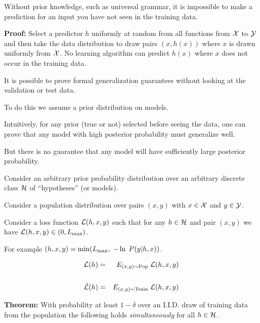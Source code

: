 {{Without prior knowledge, such as universal grammar, it is impossible to make a prediction for an input you have not seen in the training data.


\vfill
{\bf Proof:} Select a predictor $h$ uniformly at random from all functions from ${\cal X}$ to ${\cal Y}$ and then take the data distribution to draw pairs $(x, h(x))$
where $x$ is drawn uniformly from ${\cal X}$.  No learning algorithm can predict $h(x)$ where $x$ does not occur in the training data.

}


It is possible to prove formal generalization guarantees without looking at the validation or test data.

\vfill
To do this we assume a prior distribution on models.

\vfill
Intuitively, for any prior (true or not) selected before seeing the data, one can prove that
any model with high posterior probability must generalize well.

\vfill
But there is no guarantee that any model will have sufficiently large posterior probability.



Consider an arbitrary prior probability distribution over an arbitrary discrete class ${\cal H}$ of ``hypotheses'' (or models).

\vfill
Consider a population distribution over pairs $(x,y)$ with $x \in {\cal X}$ and $y \in {\cal Y}$.

\vfill
Consider a loss function ${\cal L}(h,x,y)$ such that for any $h \in {\cal H}$ and pair $(x,y)$ we have
${\cal L}(h,x,y) \in (0,L_\mathrm{max})$.

\vfill
For example ${\cal }(h,x,y) = \min(L_\mathrm{max},\; - \ln\; P(y|h,x))$.

\begin{eqnarray*}
{\cal L}(h)  & = &  E_{(x,y)\sim \mathrm{Pop}}\;{\cal L}(h,x,y) \\
\\
\hat{{\cal L}}(h) & = & E_{(x,y)\sim \mathrm{Train}}\;{\cal L}(h,x,y)
\end{eqnarray*}

\vfill
    {\bf Theorem:} With probability
    at least $1-\delta$ over an I.I.D. draw of training data from the population the following holds {\em simultaneously} for all $h \in {\cal H}$.

}
